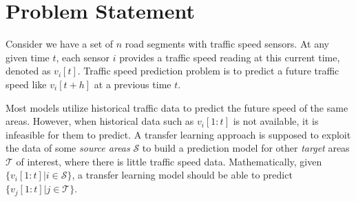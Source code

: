 \section{Problem Statement}
Consider we have a set of $n$ road segments with traffic speed sensors. 
At any given time $t$, 
each sensor $i$ provides a traffic speed reading at this current time, denoted as $v_i[t]$.
Traffic speed prediction problem is to predict a future traffic speed like $v_i[t+h]$ at a previous time $t$. 

Most models utilize historical traffic data to predict the future speed of the same areas. 
However, when historical data such as $v_i[1:t]$ is not available, it is infeasible for them to predict. 
A transfer learning approach is supposed to exploit the data of some \textit{source areas} $\mathcal{S}$ to build a prediction model for other \textit{target} areas  $\mathcal{T}$ of interest, where there is little traffic speed data.
Mathematically, given $\{v_i[1:t]|i\in \mathcal{S}\}$, a transfer learning model should be able to predict $\{v_j[1:t]|j\in \mathcal{T}\}$.



